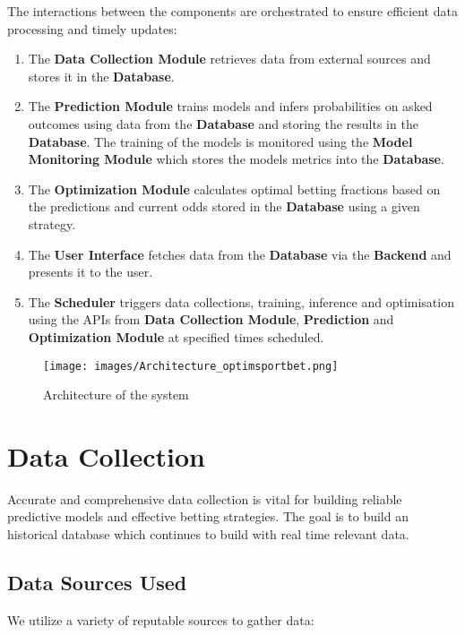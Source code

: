 The interactions between the components are orchestrated to ensure efficient data processing and timely updates:

\begin{enumerate}
    \item The \textbf{Data Collection Module} retrieves data from external sources and stores it in the \textbf{Database}.
    \item The \textbf{Prediction Module} trains models and infers probabilities on asked outcomes using data from the  \textbf{Database} and storing the results in the  \textbf{Database}. The training of the models is monitored using the \textbf{Model Monitoring Module} which stores the models metrics into the \textbf{Database}.
    \item The \textbf{Optimization Module} calculates optimal betting fractions based on the predictions and current odds stored in the \textbf{Database} using a given strategy.
    \item The \textbf{User Interface} fetches data from the \textbf{Database} via the \textbf{Backend} and presents it to the user.
    \item The \textbf{Scheduler} triggers data collections, training, inference and optimisation using the APIs from \textbf{Data Collection Module}, \textbf{Prediction} and \textbf{Optimization Module} at specified times scheduled.
\end{enumerate}

\begin{figure}[H]
    \centering
    \texttt{[image: images/Architecture\_optimsportbet.png]}
    \caption{Architecture of the system}
    \label{fig:elo_score_5_teams_during_time}
\end{figure}


\section{Data Collection}

Accurate and comprehensive data collection is vital for building reliable predictive models and effective betting strategies. The goal is to build an historical database which continues to build with real time relevant data.

\subsection{Data Sources Used}

We utilize a variety of reputable sources to gather data:

